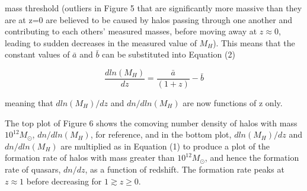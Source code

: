 \documentclass[12pt, twocolumn]{report}%
\begin{document}
\noindent mass threshold (outliers in Figure 5 that are significantly more massive than they are at z=0 are believed to be caused by halos passing through one another and contributing to each others' measured masses, before moving away at $z\approx0$, leading to  sudden decreases in the measured value of $M_H$). This means that the constant values of $\bar a$ and $\bar b$ can be substituted into Equation (2)

\begin{equation}
    \frac{dln(M_H)}{dz}=\frac{\bar a}{(1+z)}-\bar b
\end{equation}

\noindent meaning that $dln(M_H)/dz$ and $dn/dln(M_H)$ are now functions of z only.\par

The top plot of Figure 6 shows the comoving number density of halos with mass $10^{12}M_\odot$, $dn/dln(M_H)$, for reference, and in the bottom plot, $dln(M_H)/dz$ and $dn/dln(M_H)$ are multiplied as in Equation (1) to produce a plot of the formation rate of halos with mass greater than $10^{12}M_\odot$, and hence the formation rate of quasars, $dn/dz$, as a function of redshift. The formation rate peaks at $z\approx1$ before decreasing for $1 \gtrsim z \geq 0$.

\onecolumngrid
\end{document}
